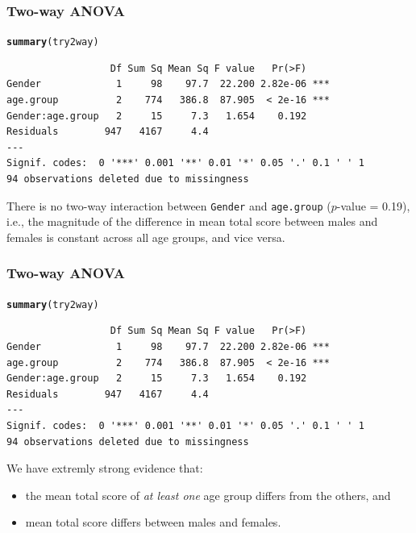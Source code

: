 \documentclass{beamer}\usepackage[]{graphicx}\usepackage[]{color}
\makeatletter
\newcommand{\hlstd}[1]{\textcolor[rgb]{0.345,0.345,0.345}{#1}}%
\newcommand{\hlkwd}[1]{\textcolor[rgb]{0.737,0.353,0.396}{\textbf{#1}}}%
\newenvironment{kframe}{%
 \def\at@end@of@kframe{}%
 \ifinner\ifhmode%
  \def\at@end@of@kframe{\end{minipage}}%
  \begin{minipage}{\columnwidth}%
 \fi\fi%
 \def\FrameCommand##1{\hskip\@totalleftmargin \hskip-\fboxsep
 \colorbox{shadecolor}{##1}\hskip-\fboxsep
     \hskip-\linewidth \hskip-\@totalleftmargin \hskip\columnwidth}%
 \MakeFramed {\advance\hsize-\width
   \@totalleftmargin\z@ \linewidth\hsize
   \@setminipage}}%
 {\par\unskip\endMakeFramed%
 \at@end@of@kframe}
\newenvironment{knitrout}{}{} %
\makeatother
\begin{document}
\begin{frame}[fragile]
  \frametitle{Two-way ANOVA}
\begin{knitrout}
\color{fgcolor}\begin{kframe}
\begin{alltt}
\hlkwd{summary}\hlstd{(try2way)}
\end{alltt}
\begin{verbatim}
                  Df Sum Sq Mean Sq F value   Pr(>F)    
Gender             1     98    97.7  22.200 2.82e-06 ***
age.group          2    774   386.8  87.905  < 2e-16 ***
Gender:age.group   2     15     7.3   1.654    0.192    
Residuals        947   4167     4.4                     
---
Signif. codes:  0 '***' 0.001 '**' 0.01 '*' 0.05 '.' 0.1 ' ' 1
94 observations deleted due to missingness
\end{verbatim}
\end{kframe}
\end{knitrout}
There is no two-way interaction between \texttt{Gender} and \texttt{age.group} ($p$-value = 0.19), i.e., the magnitude of the difference in mean total score between males and females is constant across all age groups, and vice versa.
\end{frame} 


\begin{frame}[fragile]
  \frametitle{Two-way ANOVA}
\begin{knitrout}
\color{fgcolor}\begin{kframe}
\begin{alltt}
\hlkwd{summary}\hlstd{(try2way)}
\end{alltt}
\begin{verbatim}
                  Df Sum Sq Mean Sq F value   Pr(>F)    
Gender             1     98    97.7  22.200 2.82e-06 ***
age.group          2    774   386.8  87.905  < 2e-16 ***
Gender:age.group   2     15     7.3   1.654    0.192    
Residuals        947   4167     4.4                     
---
Signif. codes:  0 '***' 0.001 '**' 0.01 '*' 0.05 '.' 0.1 ' ' 1
94 observations deleted due to missingness
\end{verbatim}
\end{kframe}
\end{knitrout}
We have extremly strong evidence that:
\begin{itemize}
\item the mean total score of {\em at least one} age group differs from the others, and
\item mean total score differs between males and females.
\end{itemize}
\end{frame} 
\end{document}
